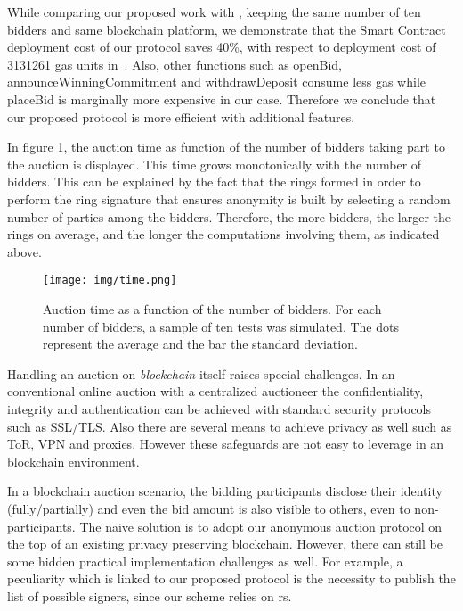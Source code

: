 While comparing our proposed work with \cite{galal2018verifiable}, keeping the same number of ten bidders and same blockchain platform, we demonstrate that the Smart Contract deployment cost of our protocol saves 40\%, with respect to deployment cost of 3131261 gas units in~\cite{galal2018verifiable}. Also, other functions such as openBid, announceWinningCommitment and withdrawDeposit consume less gas while placeBid is marginally more expensive in our case. Therefore we conclude that our proposed protocol is more efficient with additional features.

In figure \ref{fig:time}, the auction time as function of the number of bidders taking part to the auction is displayed. This time grows monotonically with the number of bidders. This can be explained by the fact that the rings formed in order to perform the ring signature that ensures anonymity is built by selecting a random number of parties among the bidders. Therefore, the more bidders, the larger the rings on average, and the longer the computations involving them, as indicated above.

\begin{figure}
    \centering
    \texttt{[image: img/time.png]}
    \caption{Auction time as a function of the number of bidders. For each number of bidders, a sample of ten tests was simulated. The dots represent the average and the bar the standard deviation.}
    \label{fig:time}
\end{figure}

Handling an auction on \emph{blockchain} itself raises special challenges. In an conventional online auction with a centralized auctioneer the confidentiality, integrity and authentication can be achieved with standard security protocols such as SSL/TLS. Also there are several means to achieve privacy as well such as ToR, VPN and proxies. However these safeguards are not easy to leverage in an blockchain environment. 

In a blockchain auction scenario, the bidding participants disclose their identity (fully/partially) and even the bid amount is also visible to others, even to non-participants. The naive solution is to adopt our anonymous auction protocol on the top of an existing privacy preserving blockchain. However, there can still be some hidden practical implementation challenges as well. For example, a peculiarity which is linked to our proposed protocol is the necessity to publish the list of possible signers, since our scheme relies on \gls{rs}. 

